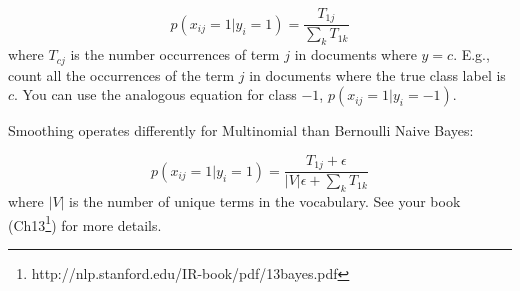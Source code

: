 \documentclass{article}
\begin{document}
$$
p(x_{ij}=1 | y_i = 1) = \frac{T_{1j}}{\sum_k T_{1k}}
$$
where $T_{cj}$ is the number occurrences of term $j$ in documents where $y=c$. E.g., count all the occurrences of the term $j$ in documents where the true class label is $c$. You can use the analogous equation for class $-1$, $p(x_{ij}=1 | y_i=-1)$.

Smoothing operates differently for Multinomial than Bernoulli Naive Bayes:

$$
p(x_{ij}=1 | y_i = 1) = \frac{T_{1j} + \epsilon}{|V|\epsilon + \sum_k T_{1k}}
$$
where $|V|$ is the number of unique terms in the vocabulary. See your book (Ch13\footnote{http://nlp.stanford.edu/IR-book/pdf/13bayes.pdf}) for more details.
\end{document}
